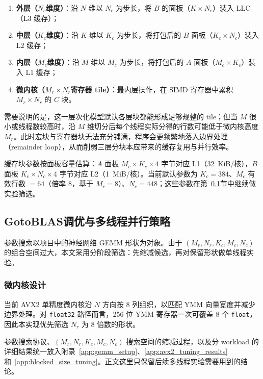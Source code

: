 \documentclass[a4paper,11pt,oneside]{article}
\begin{document}
\begin{enumerate}
    \item \textbf{外层（$N_c$维度）}：沿 $N$ 维以 $N_c$ 为步长，将 $B$ 的面板（$K \times N_c$）装入 LLC（L3 缓存）；
    \item \textbf{中层（$K_c$维度）}：沿 $K$ 维以 $K_c$ 为步长，将打包后的 $B$ 面板（$K_c \times N_c$）装入 L2 缓存；
    \item \textbf{内层（$M_c$维度）}：沿 $M$ 维以 $M_c$ 为步长，将打包后的 $A$ 面板（$M_c \times K_c$）装入 L1 缓存；
    \item \textbf{微内核（$M_r \times N_r$寄存器 tile）}：最内层操作，在 SIMD 寄存器中累积 $M_r \times N_r$ 的 $C$ 块。
\end{enumerate}

需要说明的是，这一层次化模型默认各层块都能形成足够规整的 tile；但当 $M$ 很小或线程数较高时，沿 $M$ 维切分后每个线程实际分得的行数可能低于微内核高度 $M_r$。此时宏块与寄存器块无法充分铺满，程序会更频繁地落入边界处理（remainder loop），从而削弱三层分块本应带来的缓存复用与并行效率。

缓存块参数按面板容量估算：$A$ 面板 $M_c \times K_c \times 4$ 字节对应 L1（32~KiB/核），$B$ 面板 $K_c \times N_c \times 4$ 字节对应 L2（1~MiB/核）。当前默认参数为 $K_c=384$、$M_c$ 有效行数 $=64$（倍率 8，基于 $M_r=8$）、$N_c=448$；这些参数在第~\ref{sec:avx2_tuning}节中继续做实验筛选。

\subsection{GotoBLAS调优与多线程并行策略}\label{sec:avx2_tuning}

参数搜索以项目中的神经网络 GEMM 形状为对象。由于 $(M_r,N_r,K_c,M_c,N_c)$ 的组合空间过大，本文采用分阶段筛选：先缩减候选，再对保留形状做单线程实验。

\subsubsection{微内核设计}\label{subsec:microkernel}

当前 AVX2 单精度微内核沿 $N$ 方向按 8 列组织，以匹配 YMM 向量宽度并减少边界处理。对 \texttt{float32} 路径而言，256 位 YMM 寄存器一次可覆盖 8 个 \texttt{float}，因此本实现优先筛选 $N_r$ 为 8 倍数的形状。

参数搜索协议、$(M_r,N_r,K_c,M_c,N_c)$ 搜索空间的缩减过程，以及分 workload 的详细结果统一放入附录~\ref{app:gemm_setup}、\ref{app:avx2_tuning_results} 和~\ref{app:blocked_size_tuning}。正文这里只保留后续多线程实验需要用到的结论。
\end{document}
